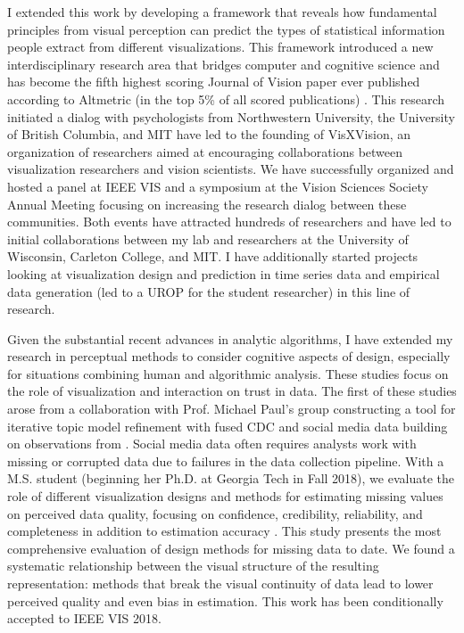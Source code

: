 \documentclass[11pt]{article}
\begin{document}
I extended this work by developing a framework that reveals how fundamental principles from visual perception can predict the types of statistical information people extract from different visualizations. This framework introduced a new interdisciplinary research area that bridges computer and cognitive science and has become the fifth highest scoring Journal of Vision paper ever published according to Altmetric (in the top 5\% of all scored publications) \cite{szafir2016Four}. This research initiated a dialog with psychologists from Northwestern University, the University of British Columbia, and MIT have led to the founding of VisXVision, an organization of researchers aimed at encouraging collaborations between visualization researchers and vision scientists. We have successfully organized and hosted a panel at IEEE VIS and a symposium at the Vision Sciences Society Annual Meeting focusing on increasing the research dialog between these communities. Both events have attracted hundreds of researchers and have led to initial collaborations between my lab and researchers at the University of Wisconsin, Carleton College, and MIT. I have additionally started projects looking at visualization design and prediction in time series data and empirical data generation (led to a UROP for the student researcher) in this line of research. 

Given the substantial recent advances in analytic algorithms, I have extended my research in perceptual methods to consider cognitive aspects of design, especially for situations combining human and algorithmic analysis. These studies focus on the role of visualization and interaction on trust in data. The first of these studies arose from a collaboration with Prof. Michael Paul's group constructing a tool for iterative topic model refinement with fused CDC and social media data building on observations from \cite{pruss2018Zika}. Social media data often requires analysts work with missing or corrupted data due to failures in the data collection pipeline. With a M.S. student (beginning her Ph.D. at Georgia Tech in Fall 2018), we evaluate the role of different visualization designs and methods for estimating missing values on perceived data quality, focusing on confidence, credibility, reliability, and completeness in addition to estimation accuracy \cite{song2019Wheres}. This study presents the most comprehensive evaluation of design methods for missing data to date. We found a systematic relationship between the visual structure of the resulting representation: methods that break the visual continuity of data lead to lower perceived quality and even bias in estimation. This work has been conditionally accepted to IEEE VIS 2018. 
\end{document}
